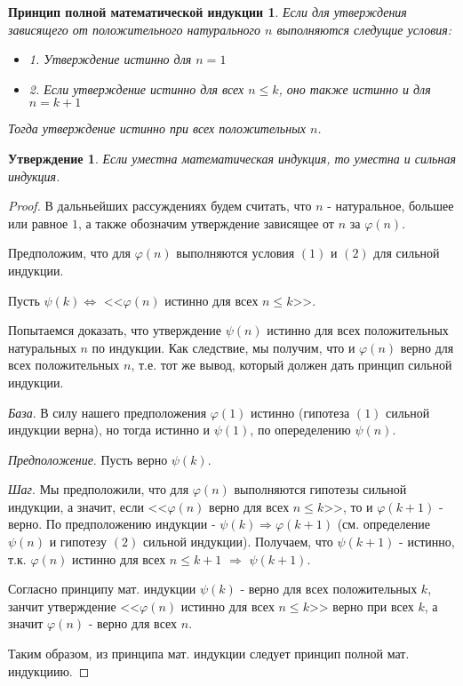 \documentclass[a4paper,12pt]{article}
\newtheorem*{Full_induction_def} {Принцип полной математической индукции}
\newtheorem*{state}{Утверждение}
\renewcommand{\phi}{\varphi}
\begin{document}
	\begin{Full_induction_def}
		Если для утверждения зависящего от положительного натурального $n$ выполняются следущие условия:
		\begin{itemize}
			\item 1. Утверждение истинно для $n = 1$
			\item 2. Если утверждение истинно для всех $n \leqslant k$, оно также истинно и для $n = k + 1$
		\end{itemize}
		Тогда утверждение истинно при всех положительных $n$.
	\end{Full_induction_def}
	\begin{state}
		Если уместна математическая индукция, то уместна и сильная индукция.
	\end{state}
	\begin{proof}
		В дальньейших рассуждениях будем считать, что $n$ - натуральное, большее или равное $1$, а также обозначим утверждение зависящее от $n$ за $\phi(n)$.

		Предположим, что для $\phi(n)$ выполняются условия $(1)$ и $(2)$ для сильной индукции.

		Пусть $\psi(k) \Leftrightarrow $ <<$\phi(n)$ истинно для всех $n \leqslant k$>>.

		Попытаемся доказать, что утверждение $\psi(n)$ истинно для всех положительных натуральных $n$ по индукции. Как следствие, мы получим, что и $\phi(n)$ верно для всех положительных $n$, т.е. тот же вывод, который должен дать принцип сильной индукции.

		\textit{База}. В силу нашего предположения $\phi(1)$ истинно (гипотеза $(1)$ сильной индукции верна), но тогда истинно и $\psi(1)$, по опеределению $\psi(n)$.

		\textit{Предположение}. Пусть верно $\psi(k)$.

		\textit{Шаг}. Мы предположили, что для $\phi(n)$ выполняются гипотезы сильной индукции, а значит, если <<$\phi(n)$ верно для всех $n \leqslant k$>>, то и $\phi(k + 1)$ - верно. По предположению индукции - $\psi(k) \Rightarrow \phi(k + 1)$ (см. определение $\psi(n)$ и гипотезу $(2)$ сильной индукции). Получаем, что $\psi(k + 1)$ - истинно, т.к. $\phi(n)$ истинно для всех $n \leqslant k + 1$ $\Rightarrow$ $\psi(k + 1)$.

		Согласно принципу мат. индукции $\psi(k)$ - верно для всех положительных $k$, занчит утверждение <<$\phi(n)$ истинно для всех $n \leqslant k$>> верно при всех $k$, а значит $\phi(n)$ - верно для всех $n$.

		Таким образом, из принципа мат. индукции следует принцип полной мат. индукциию.
 	\end{proof}
\end{document}
